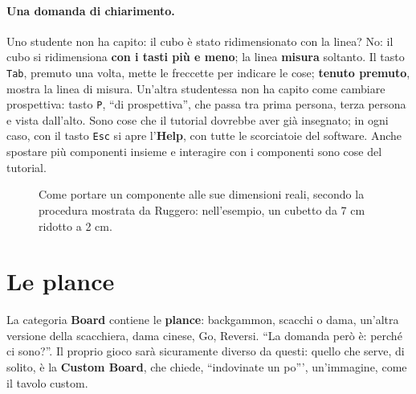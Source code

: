 \paragraph{Una domanda di chiarimento.} Uno studente non ha capito: il cubo è stato
ridimensionato con la linea? No: il cubo si ridimensiona \textbf{con i tasti più e
meno}; la linea \textbf{misura} soltanto. Il tasto \texttt{Tab}, premuto una volta,
mette le freccette per indicare le cose; \textbf{tenuto premuto}, mostra la linea di
misura. Un'altra studentessa non ha capito come cambiare prospettiva: tasto \texttt{P},
``di prospettiva'', che passa tra prima persona, terza persona e vista dall'alto. Sono
cose che il tutorial dovrebbe aver già insegnato; in ogni caso, con il tasto
\texttt{Esc} si apre l'\textbf{Help}, con tutte le scorciatoie del software. Anche
spostare più componenti insieme e interagire con i componenti sono cose del tutorial.

\begin{figure}[htbp]
\centering
{}
\caption{Come portare un componente alle sue dimensioni reali, secondo la procedura
mostrata da Ruggero: nell'esempio, un cubetto da 7 cm ridotto a 2 cm.}
\label{a8:fig:misurare}
\end{figure}

\section{Le plance}
\label{a8:sec:plance}

La categoria \textbf{Board} contiene le \textbf{plance}: backgammon, scacchi o dama,
un'altra versione della scacchiera, dama cinese, Go, Reversi. ``La domanda però è:
perché ci sono?''. Il proprio gioco sarà sicuramente diverso da questi: quello che
serve, di solito, è la \textbf{Custom Board}, che chiede, ``indovinate un po''',
un'immagine, come il tavolo custom.

